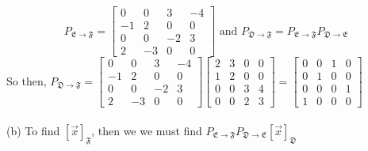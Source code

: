 \documentclass{report}
\begin{document}
\[
P_{\mathfrak{E}\rightarrow\mathfrak{F}} = 
\begin{bmatrix} 
0 & 0 & 3 & -4 \\
-1 & 2 & 0 & 0 \\
0 & 0 & -2 & 3 \\
2 & -3 & 0 & 0
\end{bmatrix} \text{ and } P_{\mathfrak{D}\rightarrow\mathfrak{F}} = P_{\mathfrak{E}\rightarrow\mathfrak{F}}P_{\mathfrak{D}\rightarrow\mathfrak{E}}
\]
So then, $P_{\mathfrak{D}\rightarrow\mathfrak{F}} =
\begin{bmatrix} 
0 & 0 & 3 & -4 \\
-1 & 2 & 0 & 0 \\
0 & 0 & -2 & 3 \\
2 & -3 & 0 & 0
\end{bmatrix} \begin{bmatrix}
2 & 3 & 0 & 0 \\
1 & 2 & 0 & 0 \\
0 & 0 & 3 & 4 \\
0 & 0 & 2 & 3
\end{bmatrix} = \begin{bmatrix}
0 & 0 & 1 & 0 \\
0 & 1 & 0 & 0 \\
0 & 0 & 0 & 1 \\
1 & 0 & 0 & 0
\end{bmatrix}$ \\
\\
\noindent
(b) To find $[\vec{x}]_{\mathfrak{F}}$, then we we must find $P_{\mathfrak{E}\rightarrow\mathfrak{F}}P_{\mathfrak{D}\rightarrow\mathfrak{E}}[\vec{x}]_{\mathfrak{D}}$
\end{document}
